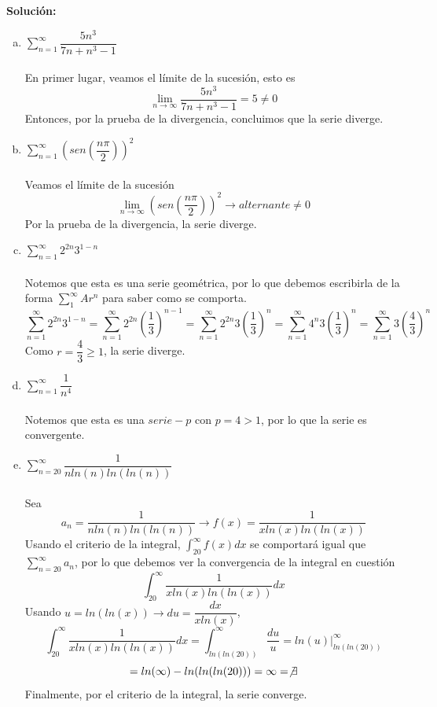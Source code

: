 \documentclass[12pt]{article}
\newenvironment{solucion}
{\begin{mdframed}[backgroundcolor=black!10]
		{\bf Solución:}\\
	}
	{
	\end{mdframed}
}
\newenvironment{preguntas}
{\begin{enumerate}\itemsep12pt
	}
	{
	\end{enumerate}
}
\newcommand{\ev}{\Big|}
\newcommand{\ra}{\rightarrow}
\begin{document}
\begin{preguntas}
\begin{solucion}
\begin{enumerate}[a)]
\item $\sum\limits_{n=1}^{\infty}\dfrac{5n^3}{7n+n^3-1}$\\
			\\
			En primer lugar, veamos el límite de la sucesión, esto es
			$$\lim\limits_{n\ra \infty} \dfrac{5n^3}{7n+n^3-1} = 5 \neq 0$$
			Entonces, por la prueba de la divergencia, concluimos que la serie diverge.
\item $\sum\limits_{n=1}^{\infty}\left(sen\left(\dfrac{n\pi}{2}\right)\right)^2$\\
			\\
			Veamos el límite de la sucesión
			$$\lim\limits_{n\ra \infty} \left(sen\left(\dfrac{n\pi}{2}\right)\right)^2 \ra alternante \neq 0$$
			Por la prueba de la divergencia, la serie diverge.
\item $\sum\limits_{n=1}^{\infty}2^{2n}3^{1-n}$\\
			\\
			Notemos que esta es una serie geométrica, por lo que debemos escribirla de la forma $\sum\limits_1^{\infty} Ar^n$ para saber como se comporta.
			$$\sum\limits_{n=1}^{\infty}2^{2n}3^{1-n}
			= \sum\limits_{n=1}^{\infty}2^{2n}\left(\dfrac{1}{3}\right)^{n-1}
			= \sum\limits_{n=1}^{\infty}2^{2n}3\left(\dfrac{1}{3}\right)^n
			= \sum\limits_{n=1}^{\infty}4^{n}3\left(\dfrac{1}{3}\right)^n
			= \sum\limits_{n=1}^{\infty}3\left(\dfrac{4}{3}\right)^n$$
			Como $r = \dfrac{4}{3} \geq 1$, la serie diverge.
\item $\sum\limits_{n=1}^{\infty}\dfrac{1}{n^4}$\\
			\\
			Notemos que esta es una $serie-p$ con $p=4>1$, por lo que la serie es convergente.
\item $\sum\limits_{n=20}^{\infty}\dfrac{1}{nln(n)ln(ln(n))}$\\
			\\
			Sea
			$$a_n = \dfrac{1}{nln(n)ln(ln(n))} \ra f(x) = \dfrac{1}{xln(x)ln(ln(x))}$$
			Usando el criterio de la integral, $\displaystyle\int_{20}^{\infty}f(x)dx$ se comportará igual que $\sum\limits_{n=20}^{\infty} a_n$, por lo que debemos ver la convergencia de la integral en cuestión
			$$\int_{20}^{\infty} \dfrac{1}{xln(x)ln(ln(x))} dx$$
			Usando $u=ln(ln(x)) \ra du = \dfrac{dx}{xln(x)}$,
			$$\int_{20}^{\infty} \dfrac{1}{xln(x)ln(ln(x))} dx
			= \int_{ln(ln(20))}^{\infty} \dfrac{du}{u} = ln(u) \ev_{ln(ln(20))}^{\infty}$$
			$$ = ln(\infty) - ln(ln(ln(20))) = \infty = \not \exists$$
			Finalmente, por el criterio de la integral, la serie converge.

\end{enumerate}
\end{solucion}
\end{preguntas}
\end{document}
